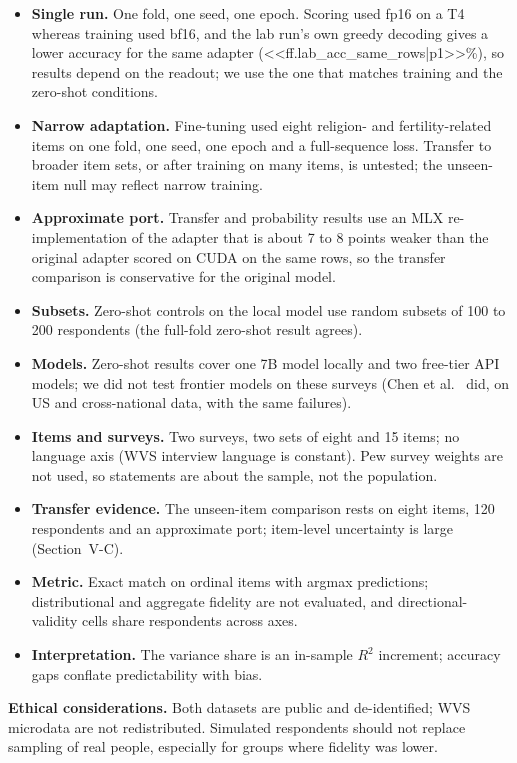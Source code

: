 \documentclass[conference]{IEEEtran}
\begin{document}
\begin{itemize}
    \item \textbf{Single run.} One fold, one seed, one epoch. Scoring used fp16 on a T4 whereas training used bf16, and the lab run's own greedy decoding gives a lower accuracy for the same adapter (<<ff.lab_acc_same_rows|p1>>\%), so results depend on the readout; we use the one that matches training and the zero-shot conditions.
    \item \textbf{Narrow adaptation.} Fine-tuning used eight religion- and fertility-related items on one fold, one seed, one epoch and a full-sequence loss. Transfer to broader item sets, or after training on many items, is untested; the unseen-item null may reflect narrow training.
    \item \textbf{Approximate port.} Transfer and probability results use an MLX re-implementation of the adapter that is about 7 to 8 points weaker than the original adapter scored on CUDA on the same rows, so the transfer comparison is conservative for the original model.
    \item \textbf{Subsets.} Zero-shot controls on the local model use random subsets of 100 to 200 respondents (the full-fold zero-shot result agrees).
    \item \textbf{Models.} Zero-shot results cover one 7B model locally and two free-tier API models; we did not test frontier models on these surveys (Chen et al.~\cite{chen2026} did, on US and cross-national data, with the same failures).
    \item \textbf{Items and surveys.} Two surveys, two sets of eight and 15 items; no language axis (WVS interview language is constant). Pew survey weights are not used, so statements are about the sample, not the population.
    \item \textbf{Transfer evidence.} The unseen-item comparison rests on eight items, 120 respondents and an approximate port; item-level uncertainty is large (Section~V-C).
    \item \textbf{Metric.} Exact match on ordinal items with argmax predictions; distributional and aggregate fidelity are not evaluated, and directional-validity cells share respondents across axes.
    \item \textbf{Interpretation.} The variance share is an in-sample $R^2$ increment; accuracy gaps conflate predictability with bias.
\end{itemize}

\textbf{Ethical considerations.} Both datasets are public and de-identified; WVS microdata are not redistributed. Simulated respondents should not replace sampling of real people, especially for groups where fidelity was lower.
\end{document}
